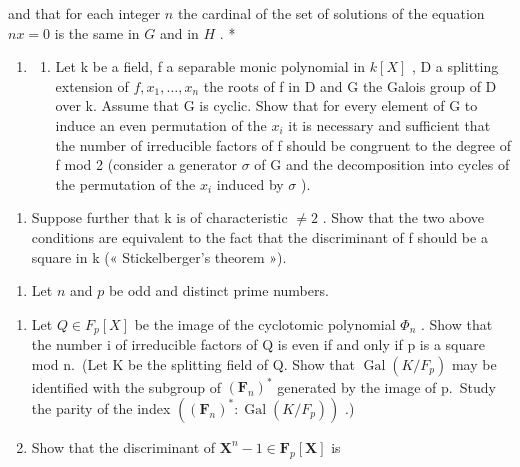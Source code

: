 and that for each integer \(n\) the cardinal of the set of solutions of the equation \(nx = 0\) is the same in \(G\) and in \(H\) . *

\begin{enumerate}
\def\labelenumi{\arabic{enumi})}
\setcounter{enumi}{21}
\tightlist
\item
  \begin{enumerate}
  \def\labelenumii{\alph{enumii})}
  \tightlist
  \item
    Let k be a field, f a separable monic polynomial in \(k[X]\) , D a splitting extension of \(f, x_{1}, \ldots, x_{n}\) the roots of f in D and G the Galois group of D over k. Assume that G is cyclic. Show that for every element of G to induce an even permutation of the \(x_{i}\) it is necessary and sufficient that the number of irreducible factors of f should be congruent to the degree of f mod 2 (consider a generator \(\sigma\) of G and the decomposition into cycles of the permutation of the \(x_{i}\) induced by \(\sigma\) ).
  \end{enumerate}
\end{enumerate}

\begin{enumerate}
\def\labelenumi{\alph{enumi})}
\setcounter{enumi}{1}
\tightlist
\item
  Suppose further that k is of characteristic \(\neq 2\) . Show that the two above conditions are equivalent to the fact that the discriminant of f should be a square in k (« Stickelberger's theorem »).
\end{enumerate}

\begin{enumerate}
\def\labelenumi{\arabic{enumi})}
\setcounter{enumi}{22}
\tightlist
\item
  Let \(n\) and \(p\) be odd and distinct prime numbers.
\end{enumerate}

\begin{enumerate}
\def\labelenumi{\alph{enumi})}
\item
  Let \(Q \in F_{p}[X]\) be the image of the cyclotomic polynomial \(\Phi_{n}\) . Show that the number i of irreducible factors of Q is even if and only if p is a square mod n.~(Let K be the splitting field of Q. Show that \(\operatorname{Gal}(K/F_{p})\) may be identified with the subgroup of \((\mathbf{F}_{n})^{*}\) generated by the image of p.~Study the parity of the index \(((\mathbf{F}_{n})^{*}: \operatorname{Gal}(K/F_{p}))\) .)
\item
  Show that the discriminant of \(\mathbf{X}^n - 1 \in \mathbf{F}_p[\mathbf{X}]\) is
\end{enumerate}

